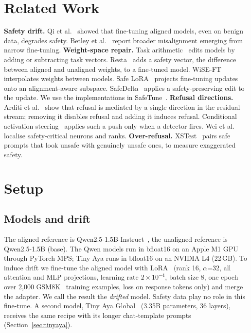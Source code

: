 \documentclass[conference]{IEEEtran}
\begin{document}
\section{Related Work}
\textbf{Safety drift.} Qi et al.~\cite{qi2023finetuning} showed that fine-tuning aligned models, even on benign data, degrades safety. Betley et al.~\cite{betley2025emergent} report broader misalignment emerging from narrow fine-tuning.
\textbf{Weight-space repair.} Task arithmetic~\cite{ilharco2023editing} edits models by adding or subtracting task vectors. Resta~\cite{bhardwaj2024resta} adds a safety vector, the difference between aligned and unaligned weights, to a fine-tuned model. WiSE-FT~\cite{wortsman2022robust} interpolates weights between models. Safe LoRA~\cite{hsu2024safelora} projects fine-tuning updates onto an alignment-aware subspace. SafeDelta~\cite{lu2025safedelta} applies a safety-preserving edit to the update. We use the implementations in SafeTune~\cite{safetune}.
\textbf{Refusal directions.} Arditi et al.~\cite{arditi2024refusal} show that refusal is mediated by a single direction in the residual stream; removing it disables refusal and adding it induces refusal. Conditional activation steering~\cite{lee2025cast} applies such a push only when a detector fires. Wei et al.~\cite{wei2024brittleness} localise safety-critical neurons and ranks.
\textbf{Over-refusal.} XSTest~\cite{rottger2024xstest} pairs safe prompts that look unsafe with genuinely unsafe ones, to measure exaggerated safety.

\section{Setup}
\subsection{Models and drift}
The aligned reference is Qwen2.5-1.5B-Instruct~\cite{qwen25}, the unaligned reference is Qwen2.5-1.5B (base). The Qwen models run in bfloat16 on an Apple M1 GPU through PyTorch MPS; Tiny Aya runs in bfloat16 on an NVIDIA L4 (22\,GB). To induce drift we fine-tune the aligned model with LoRA~\cite{hu2022lora} (rank 16, $\alpha$=32, all attention and MLP projections, learning rate $2\times10^{-4}$, batch size 8, one epoch over 2{,}000 GSM8K~\cite{cobbe2021gsm8k} training examples, loss on response tokens only) and merge the adapter. We call the result the \emph{drifted} model. Safety data play no role in this fine-tune. A second model, Tiny Aya Global~\cite{tinyaya} (3.35B parameters, 36 layers), receives the same recipe with its longer chat-template prompts (Section~\ref{sec:tinyaya}).
\end{document}
